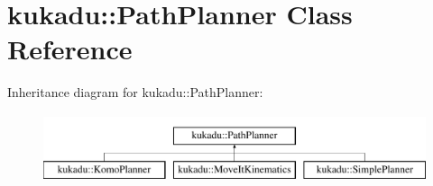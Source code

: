 \hypertarget{classkukadu_1_1PathPlanner}{\section{kukadu\-:\-:Path\-Planner Class Reference}
\label{classkukadu_1_1PathPlanner}
}
Inheritance diagram for kukadu\-:\-:Path\-Planner\-:\begin{figure}[H]
\begin{center}
\leavevmode
\includegraphics[height=2.000000cm]{classkukadu_1_1PathPlanner}
\end{center}
\end{figure}
